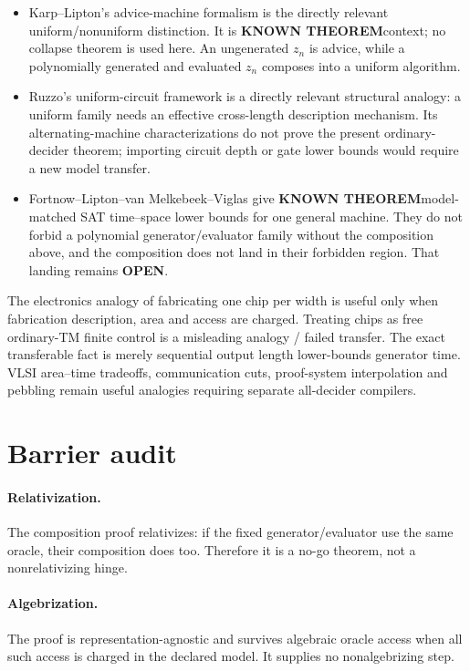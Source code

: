 \documentclass[11pt]{article}
\newcommand{\KNOWN}{\textbf{KNOWN THEOREM}}
\newcommand{\OPEN}{\textbf{OPEN}}
\begin{document}
\begin{itemize}
\item Karp--Lipton's advice-machine formalism is the directly relevant
uniform/nonuniform distinction.  It is \KNOWN context; no collapse theorem is
used here.  An ungenerated \(z_n\) is advice, while a polynomially generated
and evaluated \(z_n\) composes into a uniform algorithm.
\item Ruzzo's uniform-circuit framework is a directly relevant structural
analogy: a uniform family needs an effective cross-length description
mechanism.  Its alternating-machine characterizations do not prove the
present ordinary-decider theorem; importing circuit depth or gate lower bounds
would require a new model transfer.
\item Fortnow--Lipton--van Melkebeek--Viglas give \KNOWN model-matched SAT
time--space lower bounds for one general machine.  They do not forbid a
polynomial generator/evaluator family without the composition above, and the
composition does not land in their forbidden region.  That landing remains
\OPEN.
\end{itemize}

The electronics analogy of fabricating one chip per width is useful only when
fabrication description, area and access are charged.  Treating chips as free
ordinary-TM finite control is a misleading analogy / failed transfer.  The
exact transferable fact is merely sequential output length lower-bounds
generator time.  VLSI area--time tradeoffs, communication cuts, proof-system
interpolation and pebbling remain useful analogies requiring separate
all-decider compilers.

\section{Barrier audit}

\paragraph{Relativization.}
The composition proof relativizes: if the fixed generator/evaluator use the
same oracle, their composition does too.  Therefore it is a no-go theorem, not
a nonrelativizing hinge.

\paragraph{Algebrization.}
The proof is representation-agnostic and survives algebraic oracle access
when all such access is charged in the declared model.  It supplies no
nonalgebrizing step.
\end{document}
